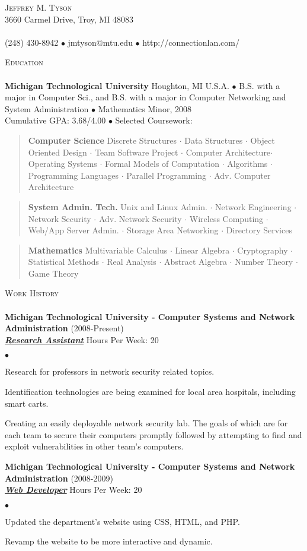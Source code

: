 \documentclass{article}
\newcommand{\area}[2]{\vspace*{-9pt} \begin{verse}\textbf{#1}   #2 \end{verse}  }
\newcommand{\lineunder}{\vspace*{-8pt} \\ \hspace*{-18pt} \hrulefill \\}
\newcommand{\header}[1]{{\hspace*{-15pt}\vspace*{6pt} \textsc{#1}} \vspace*{-6pt} \lineunder}
\newcommand{\employer}[4]{{ \textbf{#1} (#2)\\ \underline{\textbf{\emph{#3}}} \hfill Hours Per Week: #4 \\  }}
\newcommand{\contact}[3]{
\vspace*{-8pt}
\begin{center}
{\LARGE \scshape {#1}}\\
#2 \lineunder 
#3
\end{center}
\vspace*{-8pt}
}
\newenvironment{achievements}{\begin{list}{$\bullet$}{\topsep 0pt \itemsep -2pt}}{\vspace*{4pt}\end{list}}
\newcommand{\schoolwithcourses}[4]{
 \textbf{#1} #2 $\bullet$ #3\\ 
#4 $\bullet$  Selected Coursework:\\
\vspace*{5pt}
}
\begin{document}
\small
\smallskip
\vspace*{-44pt}

\contact{Jeffrey M. Tyson}
{3660 Carmel Drive, Troy, MI 48083}
{(248) 430-8942 $\bullet$ jmtyson@mtu.edu  $\bullet$ http://connectionlan.com/}

\header{Education}

\schoolwithcourses{Michigan Technological University}{Houghton, MI U.S.A.}{B.S. with a major in Computer Sci., and B.S. with a major in Computer Networking and System Administration $\bullet$ Mathematics Minor, 2008}
{Cumulative GPA: 3.68/4.00}
	\area{Computer Science}{ Discrete Structures $\cdot$ Data Structures $\cdot$ Object Oriented Design $\cdot$ 
Team Software Project $\cdot$ Computer Architecture$\cdot$ Operating Systems $\cdot$ Formal Models of Computation
$\cdot$ Algorithms $\cdot$ Programming Languages $\cdot$ Parallel Programming $\cdot$ Adv. Computer Architecture}
	\area{System Admin. Tech.}{Unix and Linux Admin. $\cdot$ Network Engineering 
	$\cdot$ Network Security $\cdot$ Adv. Network Security $\cdot$ Wireless Computing $\cdot$ Web/App Server Admin.
	$\cdot$ Storage Area Networking $\cdot$ Directory Services }
	\area{Mathematics}{Multivariable Calculus $\cdot$ Linear Algebra $\cdot$ Cryptography $\cdot$ Statistical Methods $\cdot$ Real Analysis $\cdot$ Abstract Algebra $\cdot$ Number Theory $\cdot$ Game Theory}

\header{Work History}
\employer{Michigan Technological University - Computer Systems and Network Administration}{2008-Present}{Research Assistant}{20}
\begin{achievements}
	\item Research for professors in network security related topics.
	\item Identification technologies are being examined for local area hospitals, including smart carts.
	\item Creating an easily deployable network security lab. 
			The goals of which are for each team to secure their computers promptly followed by attempting to find and exploit vulnerabilities in other team's computers.
\end{achievements}

\employer{Michigan Technological University - Computer Systems and Network Administration}{2008-2009}{Web Developer}{20}
\begin{achievements}
	\item Updated the department's website using CSS, HTML, and PHP.
	\item Revamp the website to be more interactive and dynamic.
\end{achievements}
\end{document}
